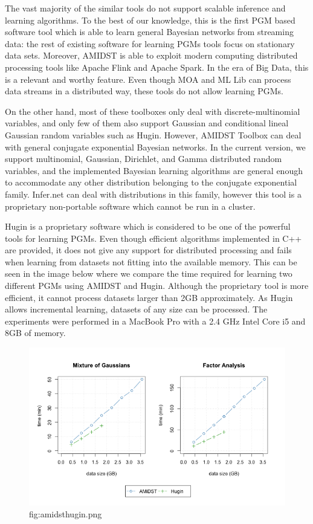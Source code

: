 \documentclass[10pt,a4paper]{article}
\begin{document}
The vast majority of the similar tools do not support scalable inference and learning algorithms. To the best of our knowledge, this is the first PGM based software tool which is able to learn general  Bayesian networks 
from streaming data:  the rest of existing software for learning PGMs tools focus on stationary data sets. Moreover, AMIDST is able to exploit modern computing distributed processing tools like Apache Flink and Apache Spark. In the era of Big Data, this is a relevant and worthy feature. Even though MOA and ML Lib can process data streams in a distributed way, these tools do not allow learning PGMs.  \newline 






On the other hand, most of these toolboxes only deal with discrete-multinomial variables, and only few of them also support Gaussian and conditional lineal Gaussian random variables such as Hugin. However, {AMIDST} Toolbox can deal with general conjugate exponential Bayesian networks. In the current version, we support multinomial, Gaussian, Dirichlet, and  Gamma distributed random variables, and the implemented Bayesian learning algorithms are general enough to accommodate any other distribution belonging to the conjugate exponential family. Infer.net can deal with distributions in this family, however this tool is a proprietary non-portable software which cannot be run in a cluster.\newline 



Hugin is a proprietary software which is considered to be one of the powerful tools for learning PGMs.  Even though efficient algorithms implemented in C++ are provided, it does not give any support for distributed processing and fails when learning from datasets  not fitting into the available memory. This can be seen in the image below where we compare the time required for learning two different PGMs using AMIDST and Hugin. Although the proprietary tool is more efficient, it cannot process datasets larger than 2GB approximately. As Hugin allows incremental learning, datasets of any size can be processed. The experiments were performed in a MacBook Pro with a 2.4 GHz Intel Core i5 and 8GB of memory.



\begin{figure}[h!]
	\centering
	\includegraphics[width=15cm]{img/amidsthugin.png}
	\caption{fig:amidsthugin.png}
\end{figure}
\end{document}
